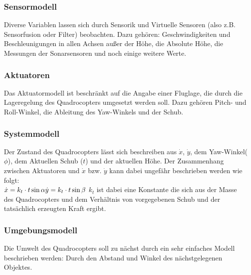 \subsubsection{Sensormodell}
Diverse Variablen lassen sich durch Sensorik und Virtuelle Sensoren (also z.B. Sensorfusion oder Filter) beobachten.
Dazu gehören: Geschwindigkeiten und Beschleunigungen in allen Achsen außer der Höhe, die Absolute Höhe, die Messungen der Sonarsensoren und noch einige weitere Werte.

\subsubsection{Aktuatoren}
Das Aktuatormodell ist beschränkt auf die Angabe einer Fluglage, die durch die Lageregelung des Quadrocopters umgesetzt werden soll. Dazu gehören Pitch- und Roll-Winkel, die Ableitung des Yaw-Winkels und der Schub.

\subsubsection{Systemmodell}
Der Zustand des Quadrocopters lässt sich beschreiben aus $\dot x$, $\dot y$, dem Yaw-Winkel($\phi$), dem Aktuellen Schub ($t$) und der aktuellen Höhe.
Der Zusammenhang zwischen Aktuatoren und $\dot x$ bzw. $\dot y$ kann dabei ungefähr beschrieben werden wie folgt: \\
\begin{math}
	\dot x = k_t \cdot t \sin \alpha \\ 
	\dot y = k_t \cdot t \sin \beta \\
\end{math}
$k_t$ ist dabei eine Konstante die sich aus der Masse des Quadrocopters und dem Verhältnis von vorgegebenen Schub und der tatsächlich erzeugten Kraft ergibt.

\subsubsection{Umgebungsmodell}
Die Umwelt des Quadrocopters soll zu nächst durch ein sehr einfaches Modell beschrieben werden: Durch den Abstand und Winkel des nächstgelegenen Objektes.

